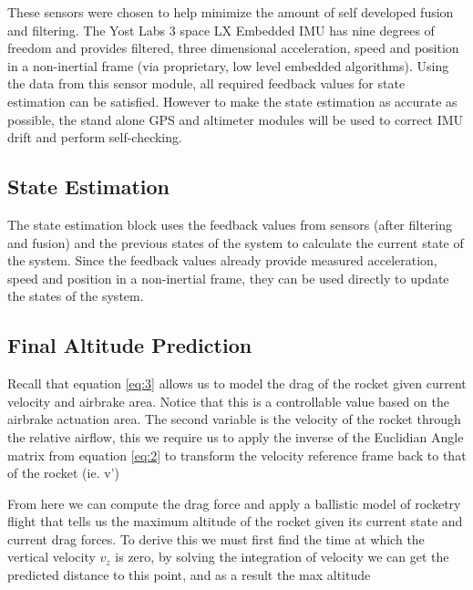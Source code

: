 \documentclass[conference, letterpaper]{IEEEtran}
\begin{document}
These sensors were chosen to help minimize the amount of self developed fusion and
filtering. The Yost Labs 3 space LX Embedded IMU has nine degrees of freedom and
provides filtered, three dimensional acceleration, speed and position in a
non-inertial frame (via proprietary, low level embedded algorithms). Using the data
from this sensor module, all required feedback values for state estimation can be
satisfied. However to make the state estimation as accurate as possible, the
stand alone GPS and altimeter modules will be used to correct IMU drift and
perform self-checking.

\subsection{State Estimation}

The state estimation block uses the feedback values from sensors (after filtering and fusion)
and the previous states of the system to calculate the current state of the system.
Since the feedback values already provide measured acceleration, speed and position
in a non-inertial frame, they can be used directly to update the states of the system.

\subsection{Final Altitude Prediction}

Recall that equation \ref{eq:3} allows us to model the drag of the rocket given current velocity and
airbrake area. Notice that this is a controllable value based on the airbrake actuation area.  The second
variable is the velocity of the rocket through the relative airflow, this we require us to apply the
inverse of the Euclidian Angle matrix from equation \ref{eq:2} to transform the velocity reference frame
back to that of the rocket (ie. v')

From here we can compute the drag force and apply a ballistic model of rocketry flight that tells us
the maximum altitude of the rocket given its current state and current drag forces. To derive this
we must first find the time at which the vertical velocity $v_{z}$ is zero, by solving the integration of velocity
we can get the predicted distance to this point, and as a result the max altitude

\begin{equation} \label{eq:5}
\end{equation}

\begin{equation} \label{eq:6}
\end{equation}
\end{document}
